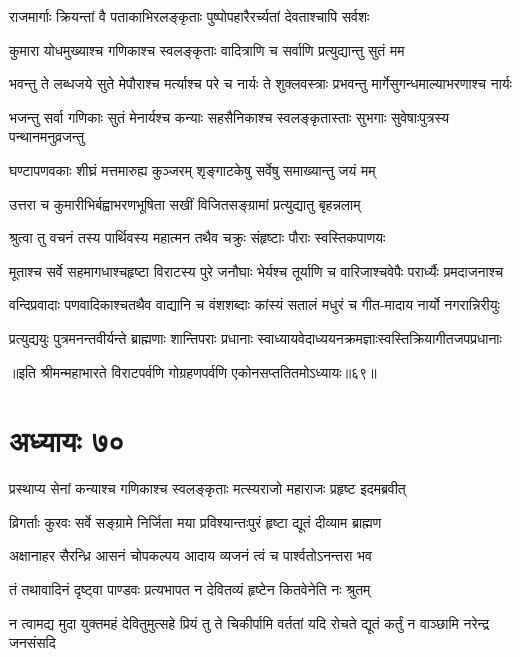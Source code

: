 \twolineshloka
{राजमार्गाः क्रियन्तां वै पताकाभिरलङ्कृताः}
{पुष्पोपहारैरर्च्यतां देवताश्चापि सर्वशः}


\twolineshloka
{कुमारा योधमुख्याश्च गणिकाश्च स्वलङ्कृताः}
{वादित्राणि च सर्वाणि प्रत्युद्यान्तु सुतं मम}


\twolineshloka
{भवन्तु ते लब्धजये सुते मेपौराश्च मर्त्याश्च परे च नार्यः}
{ते शुक्लवस्त्राः प्रभवन्तु मार्गेसुगन्धमाल्याभरणाश्च नार्यः}


\twolineshloka
{भजन्तु सर्वा गणिकाः सुतं मेनार्यश्च कन्याः सहसैनिकाश्च}
{स्वलङ्कृतास्ताः सुभगाः सुवेषाःपुत्रस्य पन्थानमनुव्रजन्तु}


\twolineshloka
{घण्टापणवकाः शीघ्रं मत्तमारुह्य कुञ्जरम्}
{शृङ्गाटकेषु सर्वेषु समाख्यान्तु जयं मम्}


\twolineshloka
{उत्तरा च कुमारीभिर्बह्वाभरणभूषिता}
{सखीं विजितसङ्ग्रामां प्रत्युद्यातु बृहन्नलाम्}


\twolineshloka
{श्रुत्वा तु वचनं तस्य पार्थिवस्य महात्मन}
{तथैव चक्रुः संहृष्टाः पौराः स्वस्तिकपाणयः}


\twolineshloka
{मूताश्च सर्वे सहमागधाश्चहृष्टा विराटस्य पुरे जनौघाः}
{भेर्यश्च तूर्याणि च वारिजाश्चवेपैः परार्ध्यैः प्रमदाजनाश्च}


\twolineshloka
{वन्दिप्रवादाः पणवादिकाश्चतथैव वाद्यानि च वंशशब्दाः}
{कांस्यं सतालं मधुरं च गीत-मादाय नार्यो नगरान्निरीयुः}


\twolineshloka
{प्रत्युद्ययुः पुत्रमनन्तवीर्यन्ते ब्राह्मणाः शान्तिपराः प्रधानाः}
{स्वाध्यायवेदाध्ययनक्रमज्ञाःस्वस्तिक्रियागीतजपप्रधानाः}

॥इति श्रीमन्महाभारते विराटपर्वणि गोग्रहणपर्वणि एकोनसप्ततितमोऽध्यायः॥६९॥

\chapter{अध्यायः ७०}

\twolineshloka
{प्रस्थाप्य सेनां कन्याश्च गणिकाश्च स्वलङ्कृताः}
{मत्स्यराजो महाराजः प्रहृष्ट इदमब्रवीत्}


\twolineshloka
{व्रिगर्ताः कुरवः सर्वे सङ्ग्रामे निर्जिता मया}
{प्रविश्यान्तःपुरं हृष्टा द्यूतं दीव्याम ब्राह्मण}


\twolineshloka
{अक्षानाहर सैरन्ध्रि आसनं चोपकल्पय}
{आदाय व्यजनं त्वं च पार्श्वतोऽनन्तरा भव}


\twolineshloka
{तं तथावादिनं दृष्ट्वा पाण्डवः प्रत्यभापत}
{न देवितव्यं हृष्टेन कितवेनेति नः श्रुतम्}


\threelineshloka
{न त्वामद्य मुदा युक्तमहं देवितुमुत्सहे}
{प्रियं तु ते चिकीर्पामि वर्ततां यदि रोचते}
{द्यूतं कर्तुं न वाञ्छामि नरेन्द्र जनसंसदि}

